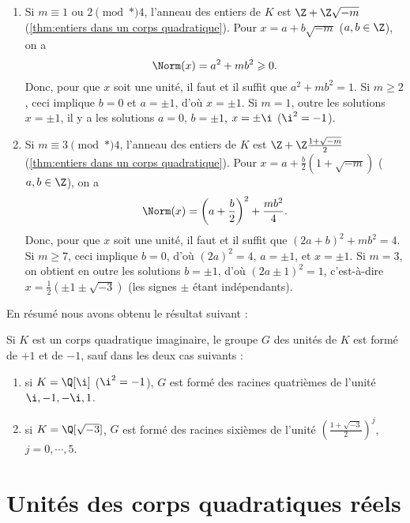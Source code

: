 \documentclass[11pt, %
  title in boldface,
  theorem in new line,
  theorem numbering = section,
  number theorems separately,
  simple name,
]{beaulivre}
\begin{document}
    \begin{enumerate}
        \item Si \( m \equiv 1 \) ou \( 2 \pmod*{4} \), l'anneau des entiers de \( K \) est \( \Z + \Z\sqrt{-m} \) (\cref{thm:entiers dans un corps quadratique}). Pour \( x = a + b\sqrt{-m} \) (\( a,b \in \Z \)), on a
        \[
            \Norm(x) = a^2 + m b^2 \geqslant 0.
        \]
        Donc, pour que \( x \) soit une unité, il faut et il suffit que \( a^2+mb^2 = 1 \). Si \( m \geqslant 2 \), ceci implique \( b = 0 \) et \( a = \pm 1 \), d'où \( x = \pm 1 \). Si \( m=1 \), outre les solutions \( x = \pm 1 \), il y a les solutions \( a = 0 \), \( b = \pm 1 \), \( x = \pm \i \) (\( \i^2 = -1 \)).
        \item Si \( m \equiv 3 \pmod*{4} \), l'anneau des entiers de \( K \) est \( \Z + \Z\frac{1+\sqrt{-m}}{2} \) (\cref{thm:entiers dans un corps quadratique}). Pour \( x = a + \frac{b}{2}(1+\sqrt{-m}) \) (\( a,b \in \Z \)), on a
        \vspace{-.2\baselineskip}%
        \[
            \Norm(x) = \left(a+\frac{b}{2}\right)^2 + \frac{m b^2}{4}.
        \]
        Donc, pour que \( x \) soit une unité, il faut et il suffit que \( (2a+b)^2+mb^2 = 4 \). Si \( m \geqslant 7 \), ceci implique \( b = 0 \), d'où \( (2a)^2 = 4 \), \( a = \pm 1 \), et \( x = \pm 1 \). Si \( m=3 \), on obtient en outre les solutions \( b = \pm 1 \), d'où \( (2a \pm 1)^2 = 1 \), c'est-à-dire \( x = \frac{1}{2}(\pm 1 \pm \sqrt{-3}) \) (les signes \( \pm \) étant indépendants).
    \end{enumerate}

    En résumé nous avons obtenu le résultat suivant :
    \begin{proposition}
        Si \( K \) est un corps quadratique imaginaire, le groupe \( G \) des unités de \( K \) est formé de \( +1 \) et de \( -1 \), sauf dans les deux cas suivants :
        \begin{enumerate}
            \item si \( K = \Q[\i] \) (\( \i^2 = -1 \)), \( G \) est formé des racines quatrièmes de l'unité \( \i, -1, -\i, 1 \).
            \item si \( K = \Q[\sqrt{-3}] \), \( G \) est formé des racines sixièmes de l'unité \( \left(\frac{1+\sqrt{-3}}{2}\right)^j \), \( j = 0, \cdots, 5 \).
        \end{enumerate}
    \end{proposition}

\section{Unités des corps quadratiques réels}
\end{document}
